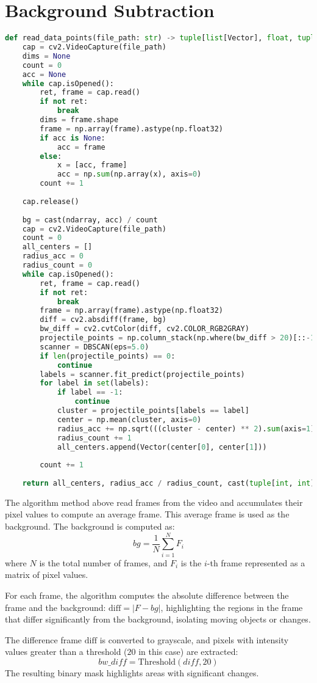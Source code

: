 \documentclass{article}
\begin{document}
	\newpage
	\section*{Background Subtraction}
	\begin{lstlisting}[language=python]
def read_data_points(file_path: str) -> tuple[list[Vector], float, tuple[int, int]]:
	cap = cv2.VideoCapture(file_path)
	dims = None
	count = 0
	acc = None
	while cap.isOpened():
		ret, frame = cap.read()
		if not ret:
			break
		dims = frame.shape
		frame = np.array(frame).astype(np.float32)
		if acc is None:
			acc = frame
		else:
			x = [acc, frame]
			acc = np.sum(np.array(x), axis=0)
		count += 1
	
	cap.release()
	
	bg = cast(ndarray, acc) / count
	cap = cv2.VideoCapture(file_path)
	count = 0
	all_centers = []
	radius_acc = 0
	radius_count = 0
	while cap.isOpened():
		ret, frame = cap.read()
		if not ret:
			break
		frame = np.array(frame).astype(np.float32)
		diff = cv2.absdiff(frame, bg)
		bw_diff = cv2.cvtColor(diff, cv2.COLOR_RGB2GRAY)
		projectile_points = np.column_stack(np.where(bw_diff > 20)[::-1])
		scanner = DBSCAN(eps=5.0)
		if len(projectile_points) == 0:
			continue
		labels = scanner.fit_predict(projectile_points)
		for label in set(labels):
			if label == -1:
				continue
			cluster = projectile_points[labels == label]
			center = np.mean(cluster, axis=0)
			radius_acc += np.sqrt(((cluster - center) ** 2).sum(axis=1).max())
			radius_count += 1
			all_centers.append(Vector(center[0], center[1]))
		
		count += 1
	
	return all_centers, radius_acc / radius_count, cast(tuple[int, int], dims)\end{lstlisting}
	
	The algorithm method above read frames from the video and accumulates their pixel values to compute an average frame. This average frame is used as the background. The background is computed as: $$ bg = \frac{1}{N} \sum_{i=1}^{N} F_i $$
	where $N$ is the total number of frames, and $F_i$ is the $i$-th frame represented as a matrix of pixel values.
	
	For each frame, the algorithm computes the absolute difference between the frame and the background: $\text{diff} = |F - bg|$, highlighting the regions in the frame that differ significantly from the background, isolating moving objects or changes.
	
	The difference frame $\text{diff}$ is converted to grayscale, and pixels with intensity values greater than a threshold ($20$ in this case) are extracted: $$ bw\_diff = \text{Threshold}(diff, 20) $$
	The resulting binary mask highlights areas with significant changes.
	
\end{document}
